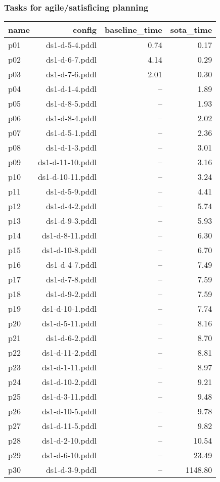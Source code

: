 \documentclass{article}
\begin{document}
                    \subsubsection*{Tasks for agile/satisficing planning}
                    
                            \begin{center}
                            \scriptsize
                            \begin{tabular}{@{}l|r|r|r@{}}
                            name & config & baseline\_time & sota\_time\\\midrule
                              p01& ds1-d-5-4.pddl&0.74&0.17\\
  p02& ds1-d-6-7.pddl&4.14&0.29\\
  p03& ds1-d-7-6.pddl&2.01&0.30\\
  p04& ds1-d-1-4.pddl&--&1.89\\
  p05& ds1-d-8-5.pddl&--&1.93\\
  p06& ds1-d-8-4.pddl&--&2.02\\
  p07& ds1-d-5-1.pddl&--&2.36\\
  p08& ds1-d-1-3.pddl&--&3.01\\
  p09& ds1-d-11-10.pddl&--&3.16\\
  p10& ds1-d-10-11.pddl&--&3.24\\
  p11& ds1-d-5-9.pddl&--&4.41\\
  p12& ds1-d-4-2.pddl&--&5.74\\
  p13& ds1-d-9-3.pddl&--&5.93\\
  p14& ds1-d-8-11.pddl&--&6.30\\
  p15& ds1-d-10-8.pddl&--&6.70\\
  p16& ds1-d-4-7.pddl&--&7.49\\
  p17& ds1-d-7-8.pddl&--&7.59\\
  p18& ds1-d-9-2.pddl&--&7.59\\
  p19& ds1-d-10-1.pddl&--&7.74\\
  p20& ds1-d-5-11.pddl&--&8.16\\
  p21& ds1-d-6-2.pddl&--&8.70\\
  p22& ds1-d-11-2.pddl&--&8.81\\
  p23& ds1-d-1-11.pddl&--&8.97\\
  p24& ds1-d-10-2.pddl&--&9.21\\
  p25& ds1-d-3-11.pddl&--&9.48\\
  p26& ds1-d-10-5.pddl&--&9.78\\
  p27& ds1-d-11-5.pddl&--&9.82\\
  p28& ds1-d-2-10.pddl&--&10.54\\
  p29& ds1-d-6-10.pddl&--&23.49\\
  p30& ds1-d-3-9.pddl&--&1148.80
                            \end{tabular}
                            \end{center}
                    
\end{document}
